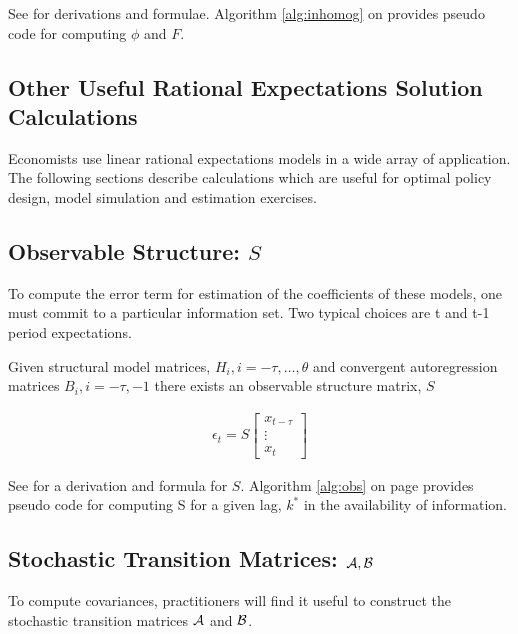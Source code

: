 \documentclass[12pt]{article}
\begin{document}
See \cite{anderson10} for  derivations and formulae.
Algorithm \ref{alg:inhomog} on \pageref{alg:inhomog}  provides pseudo code for computing $\phi$ and $F$.


\subsection{Other Useful Rational Expectations Solution Calculations}
\label{sec:useful}


Economists use linear rational expectations models in a wide array of
application. 
The following sections describe calculations which are 
useful for optimal policy design, model simulation and estimation exercises.




\subsection{Observable Structure:  $S$}

\label{sec:applications}



\label{sec:errorCalc}


To compute the error term for estimation of the coefficients of these models,
one must commit to a particular information set.
Two typical choices are t and t-1 period expectations.





Given structural model matrices, $H_i, i=-\tau,\ldots,\theta$ 
and 
 convergent autoregression matrices $B_i,i=-\tau,-1$
there exists an 
{ observable structure matrix,\/} $S$




\begin{gather}
  \epsilon_t= S \begin{bmatrix}
 x_{t-\tau}\\\vdots\\x_{t}
\end{bmatrix}
\end{gather}

See \cite{anderson10} for a derivation and formula for $S$.
Algorithm \ref{alg:obs} on page \pageref{alg:obs} provides pseudo code for computing S for a given lag, $k^\ast$ in the availability of information.


\subsection{Stochastic Transition Matrices:  $\mathcal{A}, \mathcal{B}$}
\label{sec:stochtrans}
To compute covariances, practitioners will find it useful to  construct
the stochastic transition matrices $\mathcal{A}$ and $\mathcal{B}$. 
\end{document}
